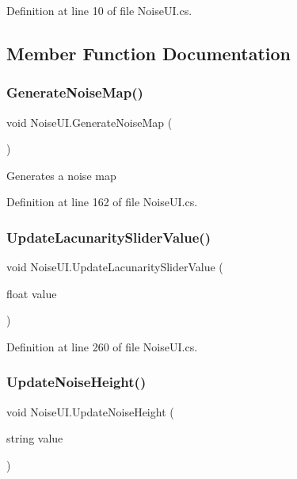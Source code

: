 Definition at line 10 of file Noise\+U\+I.\+cs.



\subsection{Member Function Documentation}
\mbox{\label{class_noise_u_i_ae8056541270c49293d5b29702d07a409}} 
\subsubsection{Generate\+Noise\+Map()}
{\footnotesize\ttfamily void Noise\+U\+I.\+Generate\+Noise\+Map (\begin{DoxyParamCaption}{ }\end{DoxyParamCaption})}



Generates a noise map 



Definition at line 162 of file Noise\+U\+I.\+cs.

\mbox{\label{class_noise_u_i_a5295256b222b213d4b41024211c2c05b}} 
\subsubsection{Update\+Lacunarity\+Slider\+Value()}
{\footnotesize\ttfamily void Noise\+U\+I.\+Update\+Lacunarity\+Slider\+Value (\begin{DoxyParamCaption}\item[{float}]{value }\end{DoxyParamCaption})}



Definition at line 260 of file Noise\+U\+I.\+cs.

\mbox{\label{class_noise_u_i_a50ce9bd5b6e42ee8bb0667f6c384da4b}} 
\subsubsection{Update\+Noise\+Height()}
{\footnotesize\ttfamily void Noise\+U\+I.\+Update\+Noise\+Height (\begin{DoxyParamCaption}\item[{string}]{value }\end{DoxyParamCaption})}



